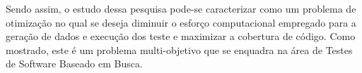 Sendo assim,  o estudo dessa pesquisa pode-se caracterizar como um problema de otimização no qual se deseja diminuir o esforço computacional empregado para a geração de dados e execução dos teste e maximizar a cobertura de código. Como mostrado, este é um problema multi-objetivo que se enquadra na área de Testes de Software Baseado em Busca.












